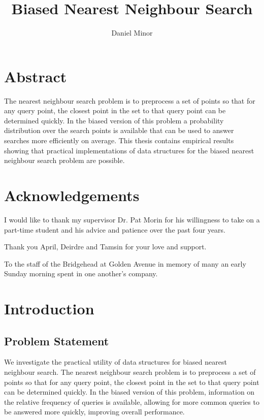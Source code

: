 \documentclass[mcs]{scsthesis}
\title {Biased Nearest Neighbour Search}
\author {Daniel Minor}
\begin{document}
\newtheorem*{thm}{Theorem}

\beforepreface


\chapter*{Abstract}

The nearest neighbour search problem is to preprocess a set of points so that
for any query point, the closest point in the set to that query point can be
determined quickly. In the biased version of this problem a probability
distribution over the search points is available that can be used to answer
searches more efficiently on average. This thesis contains empirical results
showing that practical implementations of data structures for the biased nearest
neighbour search problem are possible.

\chapter*{Acknowledgements}

I would like to thank my supervisor Dr. Pat Morin for his willingness to take on
a part-time student and his advice and patience over the past four years.

Thank you April, Deirdre and Tamsin for your love and support.

To the staff of the Bridgehead at Golden Avenue in memory of many an early
Sunday morning spent in one another's company.

\afterpreface

\chapter{Introduction}

\section{Problem Statement}

We investigate the practical utility of data structures for biased nearest
neighbour search. The nearest neighbour search problem is to preprocess a set of
points so that for any query point, the closest point in the set to that
query point can be determined quickly. In the biased version of this problem,
information on the relative frequency of queries is available, allowing for more
common queries to be answered more quickly, improving overall performance.
\end{document}
